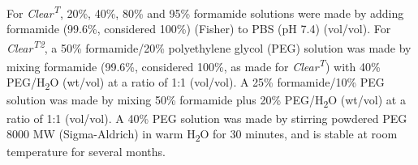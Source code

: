 For \emph{Clear\textsuperscript{T}}, 20\%, 40\%, 80\% and 95\% formamide solutions were made by adding formamide (99.6\%, considered 100\%) (Fisher) to PBS (pH 7.4) (vol/vol).
For \emph{Clear\textsuperscript{T2}}, a 50\% formamide/20\% polyethylene glycol (PEG) solution was made by mixing formamide (99.6\%, considered 100\%, as made for \emph{Clear\textsuperscript{T}}) with 40\% PEG/H\textsubscript{2}O (wt/vol) at a ratio of 1:1 (vol/vol).
A 25\% formamide/10\% PEG solution was made by mixing 50\% formamide plus 20\% PEG/H\textsubscript{2}O (wt/vol) at a ratio of 1:1 (vol/vol).
A 40\% PEG solution was made by stirring powdered PEG 8000 MW (Sigma-Aldrich) in warm H\textsubscript{2}O for 30 minutes, and is stable at room temperature for several months.